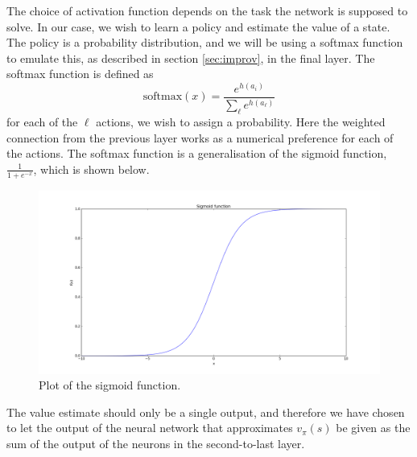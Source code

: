 \documentclass[11pt]{article}
\begin{document}
The choice of activation function depends on the task the
network is supposed to solve.
In our case, we wish to learn a policy and estimate the value of a state.
The policy is a probability distribution, and we will be using a softmax function
to emulate this, as described in section \ref{sec:improv}, in the final layer.
The softmax function is defined as
\begin{equation}
    \text{softmax}(x) = \frac{e^{h(a_i)}}{\sum\limits_{\ell} e^{h(a_\ell)}}
\end{equation}
for each of the $\ell$ actions, we wish to assign a probability.
Here the weighted connection from the previous layer works as
a numerical preference for each of the actions.
The softmax function is a generalisation of the sigmoid function, $\frac{1}{1 + e^{-x}}$,
which is shown below.
\begin{figure}[H]
    \centering
    \includegraphics[width=13cm]{include/sigmoid.png}
    \caption{Plot of the sigmoid function.}
    \label{fig:softmax}
\end{figure}
The value estimate should only be a single output, and therefore we have chosen to
let the output of the neural network that approximates $v_\pi(s)$ be given
as the sum of the output of the neurons in the second-to-last layer.
\end{document}
